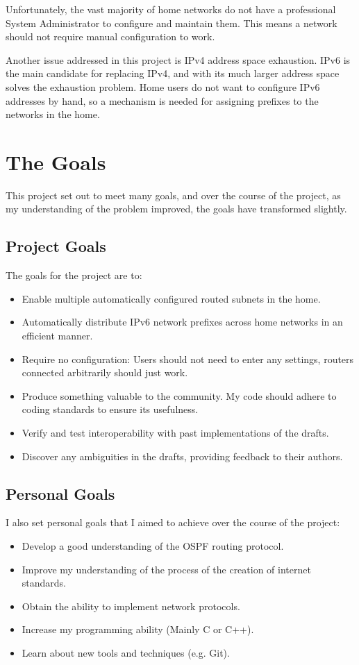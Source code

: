 \documentclass[12pt,a4paper,twoside]{report}
\begin{document}
Unfortunately, the vast majority of home networks do not have a professional
System Administrator to configure and maintain them. This means a network
should not require manual configuration to work.

Another issue addressed in this project is IPv4  address space exhaustion. IPv6 is the main candidate for
replacing IPv4, and with its much larger address space solves the exhaustion
problem. Home users do not want to configure IPv6 addresses by hand, so a
mechanism is needed for assigning prefixes to the networks in the home. 

\section{The Goals}
This project set out to meet many goals, and over the course of the project, as
my understanding of the problem improved, the goals have transformed slightly.

\subsection{Project Goals}
The goals for the project are to:

\begin{itemize}
\item Enable multiple automatically configured routed subnets in the home.
\item Automatically distribute IPv6 network prefixes across home networks in an efficient
	manner. 
\item Require no configuration: Users should not need to enter any settings,
  routers connected arbitrarily should just work.
\item Produce something valuable to the community. My code should
  adhere to coding standards to ensure its usefulness.
\item Verify and test interoperability with past implementations of the drafts.
\item Discover any ambiguities in the drafts, providing feedback to their authors.
\end{itemize}

\subsection{Personal Goals}
I also set personal goals that I aimed to achieve over the course of the
project:
\begin{itemize}
	\item Develop a good understanding of the OSPF routing protocol.
	\item Improve my understanding of the process of the creation of internet
		standards.
	\item Obtain the ability to implement network protocols.
	\item Increase my programming ability (Mainly C or C++).
	\item Learn about new tools and techniques (e.g. Git).
\end{itemize}
\end{document}
